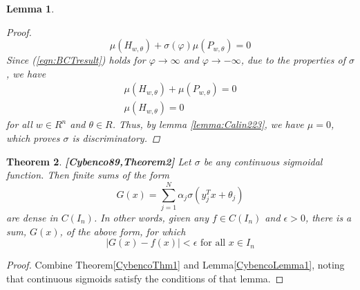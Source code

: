 \documentclass[12pt]{amsart}
\theoremstyle{plain}
\newtheorem{thm}{Theorem}[section]
\newtheorem{lemma}[thm]{Lemma}
\theoremstyle{definition}
\theoremstyle{remark}
\numberwithin{equation}{section}
\numberwithin{thm}{section}
\begin{document}
\begin{lemma}
\begin{proof}
\begin{equation}\label{eqn:BCTresult}
   \mu(H_{w,\theta}) + \sigma(\varphi)\mu(P_{w,\theta}) =0    
\end{equation}
Since (\ref{eqn:BCTresult}) holds for $\varphi \to \infty$ and $\varphi \to -\infty$, due to the properties of $\sigma$, we have 
\begin{equation*}
    \begin{aligned}
        \mu(H_{w,\theta}) + \mu(P_{w,\theta}) = 0 \\
        \mu(H_{w,\theta}) = 0
    \end{aligned}
\end{equation*}
for all $w \in R^n$ and $\theta \in R$. Thus, by lemma \ref{lemma:Calin223}, we have $\mu=0$, which proves $\sigma$ is discriminatory. 
\end{proof}
\end{lemma}


\begin{thm}\label{Cybencothm2}
\textbf{[Cybenco89,Theorem2]} 
Let $\sigma$ be any continuous sigmoidal function. Then finite sums of the form 
\begin{equation}
    G(x)=\sum_{j=1}^{N} \alpha_{j} \sigma(y_{j}^{T}x+\theta_{j})
\end{equation}
are dense in $C(I_n)$. In other words, given any $f \in C(I_{n})$ and $\epsilon > 0$, there is a sum, $G(x)$, of the above form, for which \\
\begin{equation*}
|G(x)-f(x)| < \epsilon \text{   for all $x \in I_{n}$}    
\end{equation*}
\end{thm}
\begin{proof}
    Combine Theorem\ref{CybencoThm1} and Lemma\ref{CybencoLemma1}, noting that continuous sigmoids satisfy the conditions of that lemma. 
\end{proof}
\end{document}
